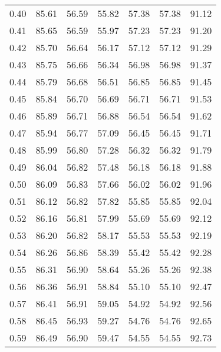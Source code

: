 \begin{tabular}{|c|c|c|c|c|c|c|}
      0.40 &     85.61 &     56.59 &      55.82 &   57.38 &      57.38 &         91.12 \\
      0.41 &     85.65 &     56.59 &      55.97 &   57.23 &      57.23 &         91.20 \\
      0.42 &     85.70 &     56.64 &      56.17 &   57.12 &      57.12 &         91.29 \\
      0.43 &     85.75 &     56.66 &      56.34 &   56.98 &      56.98 &         91.37 \\
      0.44 &     85.79 &     56.68 &      56.51 &   56.85 &      56.85 &         91.45 \\
      0.45 &     85.84 &     56.70 &      56.69 &   56.71 &      56.71 &         91.53 \\
      0.46 &     85.89 &     56.71 &      56.88 &   56.54 &      56.54 &         91.62 \\
      0.47 &     85.94 &     56.77 &      57.09 &   56.45 &      56.45 &         91.71 \\
      0.48 &     85.99 &     56.80 &      57.28 &   56.32 &      56.32 &         91.79 \\
      0.49 &     86.04 &     56.82 &      57.48 &   56.18 &      56.18 &         91.88 \\
      0.50 &     86.09 &     56.83 &      57.66 &   56.02 &      56.02 &         91.96 \\
      0.51 &     86.12 &     56.82 &      57.82 &   55.85 &      55.85 &         92.04 \\
      0.52 &     86.16 &     56.81 &      57.99 &   55.69 &      55.69 &         92.12 \\
      0.53 &     86.20 &     56.82 &      58.17 &   55.53 &      55.53 &         92.19 \\
      0.54 &     86.26 &     56.86 &      58.39 &   55.42 &      55.42 &         92.28 \\
      0.55 &     86.31 &     56.90 &      58.64 &   55.26 &      55.26 &         92.38 \\
      0.56 &     86.36 &     56.91 &      58.84 &   55.10 &      55.10 &         92.47 \\
      0.57 &     86.41 &     56.91 &      59.05 &   54.92 &      54.92 &         92.56 \\
      0.58 &     86.45 &     56.93 &      59.27 &   54.76 &      54.76 &         92.65 \\
      0.59 &     86.49 &     56.90 &      59.47 &   54.55 &      54.55 &         92.73 \\

\end{tabular}
